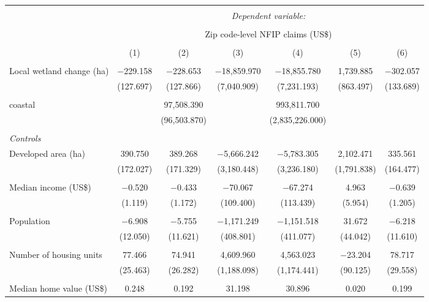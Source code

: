 \begin{tabular}{@{\extracolsep{5pt}}lcccccc} 
\\[-1.8ex]\hline 
\hline \\[-1.8ex] 
 & \multicolumn{6}{c}{\textit{Dependent variable:}} \\ 
\cline{2-7} 
\\[-1.8ex] & \multicolumn{6}{c}{Zip code-level NFIP claims (US\$)} \\ 
\\[-1.8ex] & (1) & (2) & (3) & (4) & (5) & (6)\\ 
\hline \\[-1.8ex] 
 Local wetland change (ha) & $-$229.158 & $-$228.653 & $-$18,859.970 & $-$18,855.780 & 1,739.885 & $-$302.057 \\ 
  & (127.697) & (127.866) & (7,040.909) & (7,231.193) & (863.497) & (133.689) \\ 
  & & & & & & \\ 
 coastal &  & 97,508.390 &  & 993,811.700 &  &  \\ 
  &  & (96,503.870) &  & (2,835,226.000) &  &  \\ 
  & & & & & & \\ 
 \emph{Controls} \\ Developed area (ha) & 390.750 & 389.268 & $-$5,666.242 & $-$5,783.305 & 2,102.471 & 335.561 \\ 
  & (172.027) & (171.329) & (3,180.448) & (3,236.180) & (1,791.838) & (164.477) \\ 
  & & & & & & \\ 
 Median income (US\$) & $-$0.520 & $-$0.433 & $-$70.067 & $-$67.274 & 4.963 & $-$0.639 \\ 
  & (1.119) & (1.172) & (109.400) & (113.439) & (5.954) & (1.205) \\ 
  & & & & & & \\ 
 Population & $-$6.908 & $-$5.755 & $-$1,171.249 & $-$1,151.518 & 31.672 & $-$6.218 \\ 
  & (12.050) & (11.621) & (408.801) & (411.077) & (44.042) & (11.610) \\ 
  & & & & & & \\ 
 Number of housing units & 77.466 & 74.941 & 4,609.960 & 4,563.023 & $-$23.204 & 78.717 \\ 
  & (25.463) & (26.282) & (1,188.098) & (1,174.441) & (90.125) & (29.558) \\ 
  & & & & & & \\ 
 Median home value (US\$) & 0.248 & 0.192 & 31.198 & 30.896 & 0.020 & 0.199 \\ 

\end{tabular}
